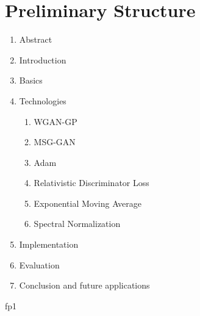\documentclass[]{article}
\begin{document}
\newpage

\section{Preliminary Structure}

\noindent
\begin{enumerate}
  \item Abstract
  \item Introduction
  \item Basics \cite{goodfellow2014generative}
  \item Technologies
  \begin{enumerate}
    \item WGAN-GP \cite{arjovsky2017wasserstein,gulrajani2017improved}
    \item MSG-GAN \cite{karnewar2020msggan}
    \item Adam \cite{kingma2017adam}
    \item Relativistic Discriminator Loss \cite{jolicoeurmartineau2018relativistic}
    \item Exponential Moving Average \cite{yazıcı2019unusual}
    \item Spectral Normalization \cite{miyato2018spectral}
  \end{enumerate}
  \item Implementation
  \item Evaluation
  \item Conclusion and future applications
\end{enumerate}

\printbibliography


fp1
\end{document}
